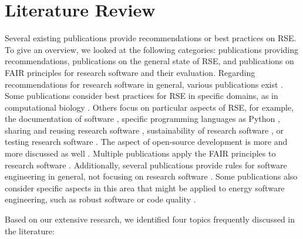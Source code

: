 \section{Literature Review}
\label{subsec:rel_work}
Several existing publications provide recommendations or best practices on \ac{RSE}. To give an overview, we looked at the following categories: publications providing recommendations, publications on the general state of \ac{RSE}, and publications on \ac{FAIR} principles for research software and their evaluation.
Regarding recommendations for research software in general, various publications exist \cite{8887228, anzt2020environment, arvanitou2021software, balaban2021ten, baxter2012research, castell2024towards, cohen2020four, crouch2014software, eisty2022developers, eisty2018survey}. Some publications consider best practices for \ac{RSE} in specific domains, as in computational biology \cite{list2017ten}. Others focus on particular aspects of \ac{RSE}, for example, the documentation of software \cite{hermann2022documenting, lee2018ten}, specific programming languages as Python \cite{irving2021research}, sharing and reusing research software \cite{park2019research}, sustainability of research software \cite{de2019makes}, or testing research software \cite{eisty2022testing}.
The aspect of open-source development is more and more discussed as well \cite{zirkelbach2019modularization, hasselbring2020open}. 
Multiple publications apply the \ac{FAIR} principles to research software \cite{barker2022introducing, hasselbring2020fair, katz2021taking, gruenpeter2020m2}.
Additionally, several publications provide rules for software engineering in general, not focusing on research software \cite{brack2022ten, david2023task, jones2009software, sandve2013ten, schlauch2018software, stodden2016enhancing, stodden2013best, struck2018research, wagner2006creation}. Some publications also consider specific aspects in this area that might be applied to energy software engineering, such as robust software \cite{taschuk2017ten} or code quality \cite{trisovic2022large}. 
\par 
Based on our extensive research, we identified four topics frequently discussed in the literature:
